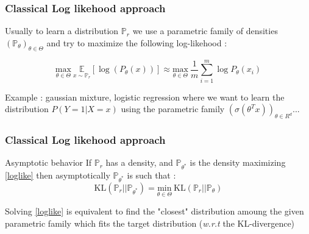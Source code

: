 \documentclass[french,9pt]{beamer}
\begin{document}
\begin{frame}
\frametitle{Classical Log likehood approach}

Usually to learn a distribution $\mathbb{P}_{r}$ we use a parametric family of densities $(\mathbb{P}_{\theta})_{\theta \in \Theta}$ and try to maximize the following log-likehood  :

\begin{equation}
\label{loglike}
 \underset{\theta \in \Theta}{\text{max}} \ \underset{x \sim \mathbb{P}_{r} }{\mathbb{E}}[\log(P_{\theta}(x))] \approx \underset{\theta \in \Theta}{\text{max}} \ \frac{1}{m} \sum_{i=1}^{m} \log P_{\theta}(x_{i})
 \end{equation}

Example : gaussian mixture, logistic regression where we want to learn the distribution $P(Y=1|X=x)$ using the parametric family $(\sigma(\theta^{T} x))_{\theta \in R^{d}}$...

\begin{center}
\end{center}

\end{frame}

\begin{frame}
\frametitle{Classical Log likehood approach}

\begin{block}{Asymptotic behavior}
If $\mathbb{P}_{r}$ has a density, and $\mathbb{P}_{\theta^{*}}$ is the density maximizing \eqref{loglike} then asymptotically $\mathbb{P}_{\theta^{*}}$ is such that : 
$$\text{KL}(\mathbb{P}_{r}||\mathbb{P}_{\theta^{*}})= \underset{\theta \in \Theta}{\text{min}} \ \text{KL}(\mathbb{P}_{r}||\mathbb{P}_{\theta})$$

Solving \eqref{loglike} is equivalent to find the "closest" distribution amoung the given parametric family which fits the target distribution (\textit{w.r.t} the KL-divergence)
\end{block}


\end{frame}
\end{document}
